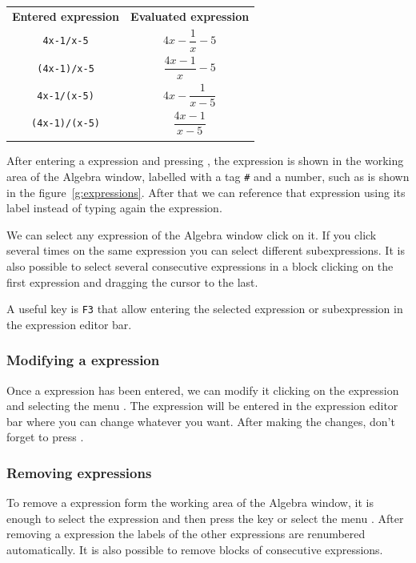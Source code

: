 \begin{center}\renewcommand{\arraystretch}{2}
\begin{tabular}{cc}
\tcrule
\textbf{Entered expression} & \textbf{Evaluated expression} \\
\texttt{4x-1/x-5} & $4x-\dfrac{1}{x}-5$ \\
\texttt{(4x-1)/x-5} & $\dfrac{4x-1}{x}-5$ \\
\texttt{4x-1/(x-5)} & $4x-\dfrac{1}{x-5}$ \\
\texttt{(4x-1)/(x-5)} & $\dfrac{4x-1}{x-5}$ \\
\bcrule
\end{tabular}
\end{center}

After entering a expression and pressing , the expression is shown in the working area of the Algebra window, labelled with a tag \verb"#" and a number, such as is shown in the figure~\ref{g:expressions}. 
After that we can reference that expression using its label instead of typing again the expression. 

We can select any expression of the Algebra window click on it. 
If you click several times on the same expression you can select different subexpressions. 
It is also possible to select several consecutive expressions in a block clicking on the first expression and dragging the cursor to the last. 

A useful key is \texttt{F3} that allow entering the selected expression or subexpression in the expression editor bar.

\subsubsection*{Modifying a expression}
Once a expression has been entered, we can modify it clicking on the expression and selecting the menu . 
The expression will be entered in the expression editor bar where you can change whatever you want. 
After making the changes, don't forget to press . 

\subsubsection*{Removing expressions}
To remove a expression form the working area of the Algebra window, it is enough to select the expression and then press the  key or select the menu .
After removing a expression the labels of the other expressions are renumbered automatically. 
It is also possible to remove blocks of consecutive expressions. 

